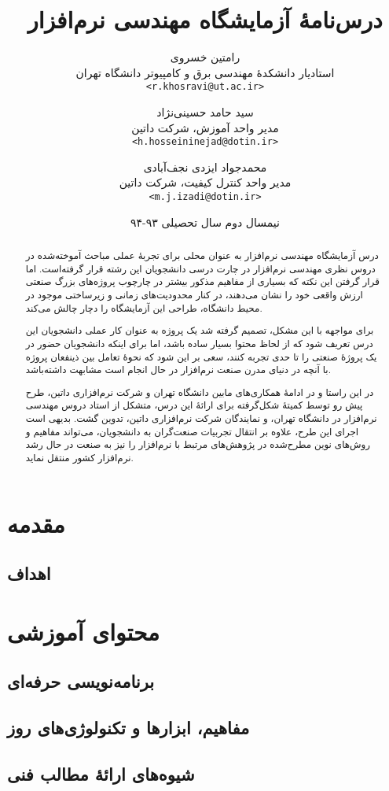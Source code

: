 \documentclass[a4paper,notitlepage]{report}
\title{درس‌نامهٔ آزمایشگاه مهندسی نرم‌افزار}
\author{
رامتین خسروی\\\small{استادیار دانشکدهٔ مهندسی برق و کامپیوتر دانشگاه تهران}\\
\small\texttt{<r.khosravi@ut.ac.ir>}\and
سید حامد حسینی‌نژاد\\\small{مدیر واحد آموزش، شرکت داتین}\\
\small\texttt{<h.hosseininejad@dotin.ir>}\and
محمدجواد ایزدی نجف‌آبادی\\\small{مدیر واحد کنترل کیفیت، شرکت داتین}\\
\small\texttt{<m.j.izadi@dotin.ir>}
}
\date{نیمسال دوم سال تحصیلی ۹۳-۹۴}
\begin{document}
\maketitle
\tableofcontents
\begin{abstract}
درس آزمایشگاه مهندسی نرم‌افزار به عنوان محلی برای تجربهٔ عملی مباحث آموخته‌شده در دروس نظری مهندسی نرم‌افزار در چارت درسی دانشجویان این رشته قرار گرفته‌است.
اما قرار گرفتن این نکته که بسیاری از مفاهیم مذکور بیشتر در چارچوب پروژه‌های بزرگ صنعتی ارزش واقعی خود را نشان می‌دهند، 
در کنار محدودیت‌های زمانی و زیرساختی موجود در محیط دانشگاه، طراحی این آزمایشگاه را دچار چالش می‌کند.

برای مواجهه با این مشکل، تصمیم گرفته شد یک پروژه به عنوان کار عملی دانشجویان این درس تعریف شود که از لحاظ محتوا بسیار ساده باشد،
اما برای اینکه  دانشجویان حضور در یک پروژهٔ صنعتی را تا حدی تجربه کنند، سعی بر این شود که نحوهٔ تعامل بین ذینفعان پروژه
با آنچه در دنیای مدرن صنعت نرم‌افزار در حال انجام است مشابهت داشته‌باشد.


در این راستا و در ادامهٔ همکاری‌های مابین دانشگاه تهران و شرکت نرم‌افزاری داتین، طرح پیش رو توسط کمیتهٔ شکل‌گرفته برای ارائهٔ این درس،
متشکل از استاد دروس مهندسی نرم‌افزار در دانشگاه تهران، و نمایندگان شرکت نرم‌افزاری داتین، تدوین گشت.
بدیهی است اجرای این طرح، علاوه بر  انتقال تجربیات صنعت‌گران به دانشجویان، می‌تواند مفاهیم و روش‌های نوین مطرح‌شده در پژوهش‌های مرتبط با نرم‌افزار را نیز
به صنعت در حال رشد نرم‌افزار کشور منتقل نماید.
\end{abstract}
\chapter{مقدمه}
\section{اهداف}
\chapter{محتوای آموزشی}
\section{برنامه‌نویسی حرفه‌ای}
\section{مفاهیم، ابزارها و تکنولوژی‌های روز}
\section{شیوه‌های ارائهٔ مطالب فنی}
\end{document}
